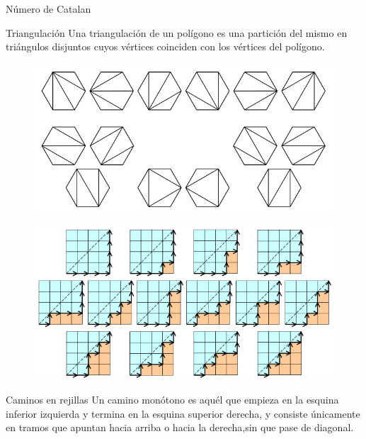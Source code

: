 \begin{frame}{Número de Catalan}
\begin{minipage}{6cm}
	\begin{block}{Triangulación}
	Una triangulación de un polígono es una partición del mismo en triángulos disjuntos cuyos vértices coinciden con los vértices del polígono.
	\end{block}
\end{minipage}
\begin{minipage}{5cm}
\begin{figure}
	\centering
	\includegraphics[scale=0.25]{ca1}	
\end{figure}


\end{minipage}
\begin{minipage}{6cm}
		\begin{figure}
			\centering
			\includegraphics[height=0.3\paperheight]{ca(1)}
		\end{figure}
\end{minipage}
\begin{minipage}{5.5cm}
	\begin{block}{Caminos en rejillas}
		 Un camino monótono es aquél que empieza en la esquina inferior izquierda y termina en la esquina superior derecha, y consiste únicamente en tramos que apuntan hacia arriba o hacia la derecha,sin que pase de diagonal.
	\end{block}
\end{minipage}
\end{frame}
